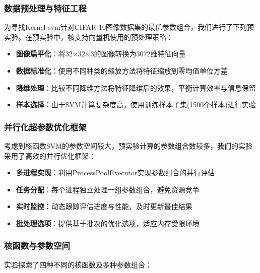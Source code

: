 \documentclass[UTF8]{report}
\theoremstyle{MyLineTheoremStyle} %
\theoremstyle{MyBlockTheoremStyle} %
\theoremstyle{MySubsubsectionStyle} %
\begin{document}
\subsubsection{数据预处理与特征工程}
为寻找Kernel svm针对CIFAR-10图像数据集的最优参数组合，我们进行了下列预实验。在预实验中，核支持向量机使用的预处理策略：

\begin{itemize}
    \item \textbf{图像扁平化}：将32×32×3的图像转换为3072维特征向量
    \item \textbf{数据标准化}：使用不同种类的缩放方法将特征缩放到零均值单位方差
    \item \textbf{降维处理}：比较不同降维方法将特征降维后的效果，平衡计算效率与信息保留
    \item \textbf{样本选择}：由于SVM计算复杂度高，使用训练样本子集(1500个样本)进行实验
\end{itemize}

\subsubsection{并行化超参数优化框架}
考虑到核函数SVM的参数空间较大，预实验计算的参数组合数较多，我们的实验采用了高效的并行优化框架：

\begin{itemize}
    \item \textbf{多进程实现}：利用ProcessPoolExecutor实现参数组合的并行评估
    \item \textbf{任务分配}：每个进程独立处理一组参数组合，避免资源竞争
    \item \textbf{实时监控}：动态跟踪评估进度与性能，及时更新最佳结果
    \item \textbf{批处理选项}：提供基于批次的优化选项，适应内存受限环境
\end{itemize}

\subsubsection{核函数与参数空间}
实验探索了四种不同的核函数及多种参数组合：
\end{document}
